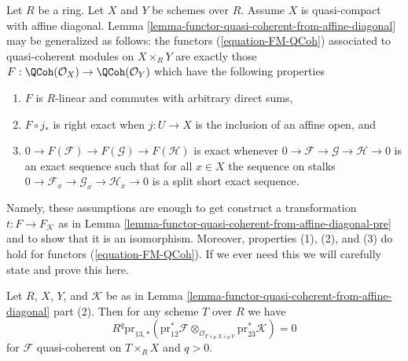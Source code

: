 \begin{remark}
\label{remark-characterize-FM-QCoh}
Let $R$ be a ring. Let $X$ and $Y$ be schemes over $R$. Assume $X$
is quasi-compact with affine diagonal.
Lemma \ref{lemma-functor-quasi-coherent-from-affine-diagonal} may
be generalized as follows: the functors
(\ref{equation-FM-QCoh}) associated to quasi-coherent modules on
$X \times_R Y$ are exactly those
$F : \QCoh(\mathcal{O}_X) \to \QCoh(\mathcal{O}_Y)$
which have the following properties
\begin{enumerate}
\item $F$ is $R$-linear and commutes with arbitrary direct sums,
\item $F \circ j_*$ is right exact when $j : U \to X$ is the
inclusion of an affine open, and
\item $0 \to F(\mathcal{F}) \to F(\mathcal{G}) \to F(\mathcal{H})$
is exact whenever $0 \to \mathcal{F} \to \mathcal{G} \to \mathcal{H} \to 0$
is an exact sequence such that for all $x \in X$ the sequence on stalks
$0 \to \mathcal{F}_x \to \mathcal{G}_x \to \mathcal{H}_x \to 0$
is a split short exact sequence.
\end{enumerate}
Namely, these assumptions are enough to get construct a transformation
$t : F \to F_\mathcal{K}$ as in
Lemma \ref{lemma-functor-quasi-coherent-from-affine-diagonal-pre}
and to show that it is an isomorphism. Moreover, properties (1), (2), and (3)
do hold for functors (\ref{equation-FM-QCoh}).
If we ever need this we will carefully state and prove this here.
\end{remark}

\begin{lemma}
\label{lemma-persistence-exactness}
Let $R$, $X$, $Y$, and $\mathcal{K}$ be as in
Lemma \ref{lemma-functor-quasi-coherent-from-affine-diagonal} part (2).
Then for any scheme $T$ over $R$ we have
$$
R^q\text{pr}_{13, *}(\text{pr}_{12}^*\mathcal{F}
\otimes_{\mathcal{O}_{T \times_R X \times_R Y}}
\text{pr}_{23}^*\mathcal{K}) = 0
$$
for $\mathcal{F}$ quasi-coherent on $T \times_R X$ and $q > 0$.
\end{lemma}

